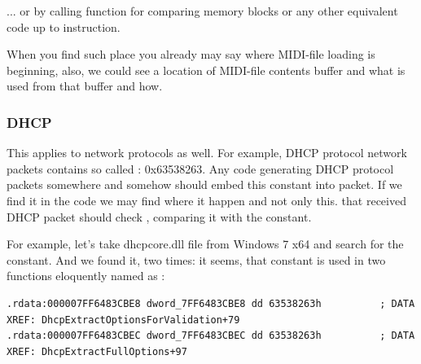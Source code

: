 {... or by calling function for comparing memory blocks  or any other equivalent code
up to  instruction.}

{When you find such place you already may say where MIDI-file loading is beginning, also, we could see a location
of MIDI-file contents buffer and what is used from that buffer and how.}

\subsubsection{DHCP}

{This applies to network protocols as well.
For example, DHCP protocol network packets contains so called : 0x63538263.
Any code generating DHCP protocol packets somewhere and somehow should embed this constant into packet.
If we find it in the code we may find where it happen and not only this.
 that received DHCP packet should check , comparing it with the constant.}

{For example, let's take dhcpcore.dll file from Windows 7 x64 and search for the constant.
And we found it, two times: it seems, that constant is used in two functions eloquently 
named as}   :

\begin{lstlisting}
.rdata:000007FF6483CBE8 dword_7FF6483CBE8 dd 63538263h          ; DATA XREF: DhcpExtractOptionsForValidation+79
.rdata:000007FF6483CBEC dword_7FF6483CBEC dd 63538263h          ; DATA XREF: DhcpExtractFullOptions+97
\end{lstlisting}


